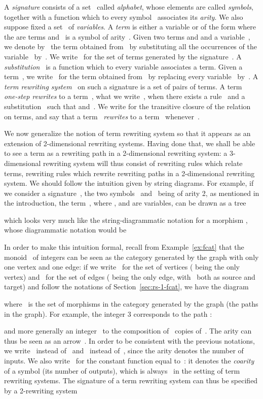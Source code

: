 \documentclass{LMCS}
\begin{document}
A \emph{signature}  consists of a set~ called
\emph{alphabet}, whose elements are called \emph{symbols}, together with a
function  which to every symbol~ associates its
\emph{arity}. We also suppose fixed a set~ of \emph{variables}. A
\emph{term} is either a variable  or of the form 
where the  are terms and~ is a symbol of arity~. Given two terms 
and  and a variable~, we denote by~ the term obtained from~ by
substituting all the occurrences of the variable~ by~. We write~
for the set of terms generated by the signature~. A
\emph{substitution}~ is a function which to every
variable associates a term. Given a term~, we write~ for the term
obtained from~ by replacing every variable~ by~. A \emph{term
  rewriting system}~ on such a signature is a set
 of pairs of terms. A term~ \emph{one-step
  rewrites} to a term~, what we write~, when there exists a
rule~ and a substitution~ such that 
and~. We write  for the transitive closure of the
relation~ on terms, and say that a term~ \emph{rewrites} to a term~
whenever~.

We now generalize the notion of term rewriting system so that it appears as an
extension of 2-dimensional rewriting systems. Having done that, we shall be able
to see a term as a rewriting path in a 2-dimensional rewriting system: a
3-dimensional rewriting system will thus consist of rewriting rules which relate
terms, \ie rewriting rules which rewrite rewriting paths in a 2-dimensional
rewriting system. We should follow the intuition given by string diagrams. For
example, if we consider a signature~, the two symbols~
and~ being of arity 2, as mentioned in the introduction, the
term~, where ,  and  are variables, can be drawn as a tree

which looks very much like the string-diagrammatic notation for a morphism
, whose diagrammatic notation would be

In order to make this intuition formal, recall from Example~\ref{ex:fcat} that
the monoid~ of integers can be seen as the category generated by the graph
with only one vertex and one edge: if we write~ for the set of
vertices ( being the only vertex) and~ for the set of edges (
being the only edge, with~ both as source and target) and follow the
notations of Section~\ref{sec:rs-1-fcat}, we have the diagram

where~ is the set of morphisms in the category generated by the
graph (\ie the paths in the graph). For example, the integer 3 corresponds to
the path :

and more generally an integer~ to the composition of ~copies of~. The
arity can thus be seen as an arrow~. In order to be
consistent with the previous notations, we write~ instead of~
and~ instead of~, since the arity denotes the number of inputs. We also
write~ for the constant function equal to~: it denotes the
\emph{coarity} of a symbol (its number of outputs), which is always~ in the
setting of term rewriting systems. The signature of a term rewriting system can
thus be specified by a 2-rewriting system
\end{document}
